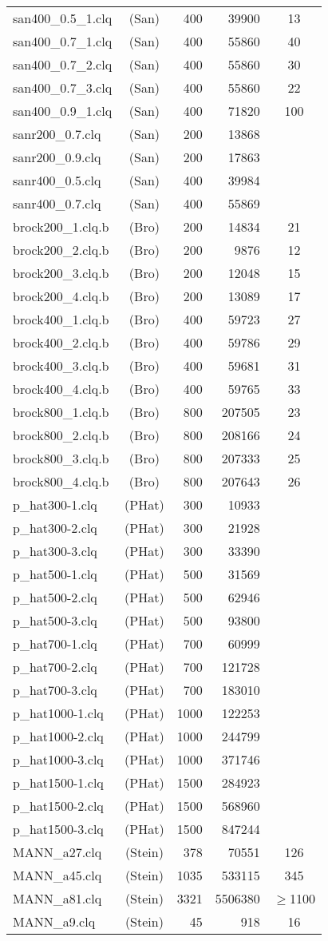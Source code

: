 \begin{supertabular}{|lc|rr|c|}
san400\_0.5\_1.clq&(San)&400&39900&13\\
san400\_0.7\_1.clq&(San)&400&55860&40\\
san400\_0.7\_2.clq&(San)&400&55860&30\\
san400\_0.7\_3.clq&(San)&400&55860&22\\
san400\_0.9\_1.clq&(San)&400&71820&100\\
sanr200\_0.7.clq&(San)&200&13868&\\
sanr200\_0.9.clq&(San)&200&17863&\\
sanr400\_0.5.clq&(San)&400&39984&\\
sanr400\_0.7.clq&(San)&400&55869&\\
brock200\_1.clq.b&(Bro)&200 &14834 &21 \\
brock200\_2.clq.b&(Bro)&200 &9876 &12 \\
brock200\_3.clq.b&(Bro)&200 &12048 &15 \\
brock200\_4.clq.b&(Bro)&200 &13089 &17 \\
brock400\_1.clq.b&(Bro)&400 &59723 &27 \\
brock400\_2.clq.b&(Bro)&400 &59786 &29 \\
brock400\_3.clq.b&(Bro)&400 &59681 &31 \\
brock400\_4.clq.b&(Bro)&400 &59765 &33 \\
brock800\_1.clq.b&(Bro)&800 &207505 &23 \\
brock800\_2.clq.b&(Bro)&800 &208166 &24 \\
brock800\_3.clq.b&(Bro)&800 &207333 &25 \\
brock800\_4.clq.b&(Bro)&800 &207643 &26 \\
p\_hat300-1.clq&(PHat)&300 &10933 & \\
p\_hat300-2.clq&(PHat)&300 &21928 & \\
p\_hat300-3.clq&(PHat)&300 &33390 & \\
p\_hat500-1.clq&(PHat)&500 &31569 & \\
p\_hat500-2.clq&(PHat)&500 &62946 & \\
p\_hat500-3.clq&(PHat)&500 &93800 & \\
p\_hat700-1.clq&(PHat)&700&60999& \\
p\_hat700-2.clq&(PHat)&700&121728& \\
p\_hat700-3.clq&(PHat)&700&183010& \\
p\_hat1000-1.clq&(PHat)&1000 &122253 & \\
p\_hat1000-2.clq&(PHat)&1000 &244799 & \\
p\_hat1000-3.clq&(PHat)&1000 &371746 & \\
p\_hat1500-1.clq&(PHat)&1500 &284923 & \\
p\_hat1500-2.clq&(PHat)&1500 &568960 & \\
p\_hat1500-3.clq&(PHat)&1500 &847244 & \\
MANN\_a27.clq&(Stein)&378&70551&126\\
MANN\_a45.clq&(Stein)&1035&533115&345\\
MANN\_a81.clq&(Stein)&3321&5506380&$\ge$1100\\
MANN\_a9.clq&(Stein)&45&918&16\\
\end{supertabular}

